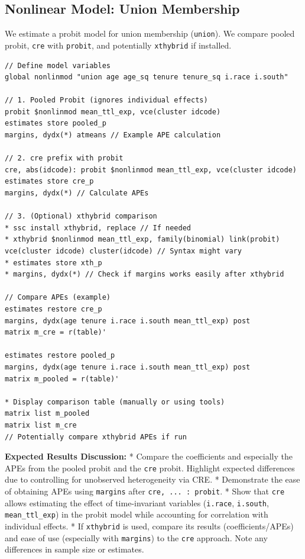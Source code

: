 \documentclass[bib]{statapress}
\begin{document}
\subsection{Nonlinear Model: Union
Membership}\label{nonlinear-model-union-membership}

We estimate a probit model for union membership (\texttt{union}). We
compare pooled probit, \texttt{cre} with \texttt{probit}, and
potentially \texttt{xthybrid} if installed.

\begin{verbatim}
// Define model variables
global nonlinmod "union age age_sq tenure tenure_sq i.race i.south"

// 1. Pooled Probit (ignores individual effects)
probit $nonlinmod mean_ttl_exp, vce(cluster idcode)
estimates store pooled_p
margins, dydx(*) atmeans // Example APE calculation

// 2. cre prefix with probit
cre, abs(idcode): probit $nonlinmod mean_ttl_exp, vce(cluster idcode)
estimates store cre_p
margins, dydx(*) // Calculate APEs

// 3. (Optional) xthybrid comparison
* ssc install xthybrid, replace // If needed
* xthybrid $nonlinmod mean_ttl_exp, family(binomial) link(probit) vce(cluster idcode) cluster(idcode) // Syntax might vary
* estimates store xth_p
* margins, dydx(*) // Check if margins works easily after xthybrid

// Compare APEs (example)
estimates restore cre_p
margins, dydx(age tenure i.race i.south mean_ttl_exp) post
matrix m_cre = r(table)'

estimates restore pooled_p
margins, dydx(age tenure i.race i.south mean_ttl_exp) post
matrix m_pooled = r(table)'

* Display comparison table (manually or using tools)
matrix list m_pooled
matrix list m_cre
// Potentially compare xthybrid APEs if run
\end{verbatim}

\textbf{Expected Results Discussion:} * Compare the coefficients and
especially the APEs from the pooled probit and the \texttt{cre} probit.
Highlight expected differences due to controlling for unobserved
heterogeneity via CRE. * Demonstrate the ease of obtaining APEs using
\texttt{margins} after \texttt{cre,\ ...\ :\ probit}. * Show that
\texttt{cre} allows estimating the effect of time-invariant variables
(\texttt{i.race}, \texttt{i.south}, \texttt{mean\_ttl\_exp}) in the
probit model while accounting for correlation with individual effects. *
If \texttt{xthybrid} is used, compare its results (coefficients/APEs)
and ease of use (especially with \texttt{margins}) to the \texttt{cre}
approach. Note any differences in sample size or estimates.
\end{document}

